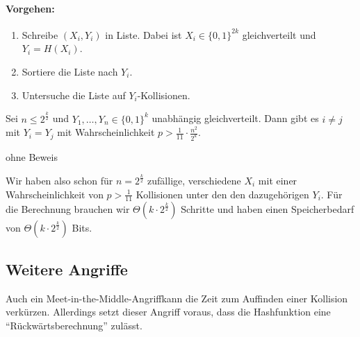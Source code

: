 \paragraph*{Vorgehen:}
\begin{enumerate}
  \item Schreibe $(X_i, Y_i)$ in Liste. Dabei ist $X_i \in \{0,1\}^{2k}$
    gleichverteilt und $Y_i = H(X_i)$.  
  \item Sortiere die Liste nach $Y_i$.
  \item Untersuche die Liste auf $Y_i$-Kollisionen.
\end{enumerate}

\begin{theorem}
Sei $n \leq 2^{\frac{k}{2}}$ und $Y_1, \ldots , Y_n \in \{0,1\}^k$
unabhängig gleichverteilt. Dann gibt es $i \not = j$ mit $Y_i = Y_j$ mit
Wahrscheinlichkeit $p > \frac{1}{11} \cdot \frac{n^2}{2^k}$.
\end{theorem}
\begin{beweis}
  ohne Beweis
\end{beweis}
Wir haben also schon für $n = 2^{\frac{k}{2}}$ zufällige, verschiedene
$X_i$ mit einer Wahrscheinlichkeit von $p > \frac{1}{11}$ Kollisionen
unter den den dazugehörigen $Y_i$. Für die Berechnung brauchen wir
$\Theta(k \cdot 2^{\frac{k}{2}})$ Schritte und haben einen
Speicherbedarf von $\Theta(k \cdot 2^{\frac{k}{2}})$ Bits.

\subsection{Weitere Angriffe}
Auch ein Meet-in-the-Middle-Angriff\indexMeetInTheMiddle kann die Zeit
zum Auffinden einer Kollision verkürzen. Allerdings setzt dieser Angriff
voraus, dass die Hashfunktion eine "`Rückwärtsberechnung"' zulässt.
